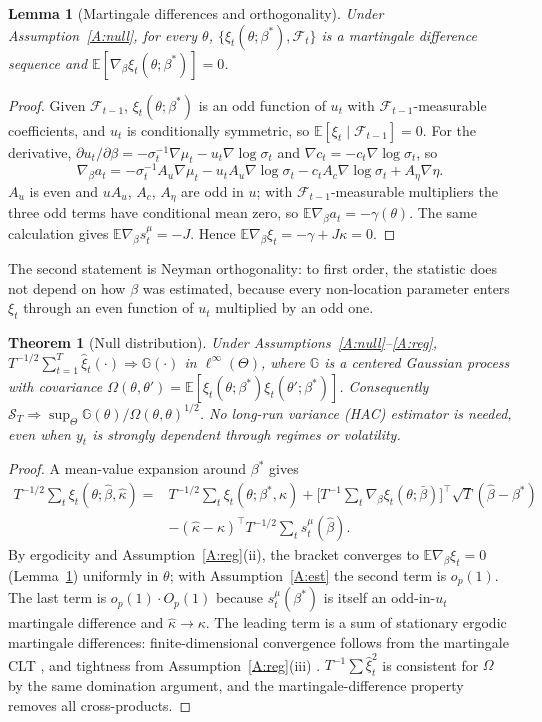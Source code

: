 \documentclass[11pt,a4paper]{article}
\newtheorem{theorem}{Theorem}
\newtheorem{lemma}{Lemma}
\theoremstyle{definition}
\theoremstyle{remark}
\newcommand{\E}{\mathbb{E}}
\newcommand{\F}{\mathcal{F}}
\newcommand{\tr}{^{\top}}
\begin{document}
\begin{lemma}[Martingale differences and orthogonality]\label{lem:mds}
Under Assumption~\ref{A:null}, for every $\theta$, $\{\xi_t(\theta;\beta^*),\F_t\}$ is a martingale difference sequence and $\E[\nabla_\beta\xi_t(\theta;\beta^*)]=0$.
\end{lemma}
\begin{proof}
Given $\F_{t-1}$, $\xi_t(\theta;\beta^*)$ is an odd function of $u_t$ with $\F_{t-1}$-measurable coefficients, and $u_t$ is conditionally symmetric, so $\E[\xi_t\mid\F_{t-1}]=0$. For the derivative, $\partial u_t/\partial\beta=-\sigma_t^{-1}\nabla\mu_t-u_t\nabla\log\sigma_t$ and $\nabla c_t=-c_t\nabla\log\sigma_t$, so
\[
\nabla_\beta a_t=-\sigma_t^{-1}A_u\nabla\mu_t-u_tA_u\nabla\log\sigma_t-c_tA_c\nabla\log\sigma_t+A_\eta\nabla\eta .
\]
$A_u$ is even and $uA_u$, $A_c$, $A_\eta$ are odd in $u$; with $\F_{t-1}$-measurable multipliers the three odd terms have conditional mean zero, so $\E\nabla_\beta a_t=-\gamma(\theta)$. The same calculation gives $\E\nabla_\beta s^\mu_t=-J$. Hence $\E\nabla_\beta\xi_t=-\gamma+J\kappa=0$.
\end{proof}
\noindent The second statement is Neyman orthogonality: to first order, the statistic does not depend on how $\beta$ was estimated, because every non-location parameter enters $\xi_t$ through an even function of $u_t$ multiplied by an odd one.

\begin{theorem}[Null distribution]\label{thm:null}
Under Assumptions~\ref{A:null}--\ref{A:reg}, $T^{-1/2}\sum_{t=1}^T\hat\xi_t(\cdot)\Rightarrow\mathbb G(\cdot)$ in $\ell^\infty(\Theta)$, where $\mathbb G$ is a centered Gaussian process with covariance $\Omega(\theta,\theta')=\E[\xi_t(\theta;\beta^*)\xi_t(\theta';\beta^*)]$. Consequently $\mathcal S_T\Rightarrow\sup_\Theta\mathbb G(\theta)/\Omega(\theta,\theta)^{1/2}$. No long-run variance (HAC) estimator is needed, even when $y_t$ is strongly dependent through regimes or volatility.
\end{theorem}
\begin{proof}
A mean-value expansion around $\beta^*$ gives
\[
\begin{aligned}
T^{-1/2}\sum_t\xi_t(\theta;\hat\beta,\hat\kappa)={}&T^{-1/2}\sum_t\xi_t(\theta;\beta^*,\kappa)+\Big[T^{-1}\sum_t\nabla_\beta\xi_t(\theta;\bar\beta)\Big]\tr\sqrt T(\hat\beta-\beta^*)\\
&-(\hat\kappa-\kappa)\tr T^{-1/2}\sum_t s^\mu_t(\hat\beta).
\end{aligned}
\]
By ergodicity and Assumption~\ref{A:reg}(ii), the bracket converges to $\E\nabla_\beta\xi_t=0$ (Lemma~\ref{lem:mds}) uniformly in $\theta$; with Assumption~\ref{A:est} the second term is $o_p(1)$. The last term is $o_p(1)\cdot O_p(1)$ because $s^\mu_t(\beta^*)$ is itself an odd-in-$u_t$ martingale difference and $\hat\kappa\to\kappa$. The leading term is a sum of stationary ergodic martingale differences: finite-dimensional convergence follows from the martingale CLT \citep{hall1980}, and tightness from Assumption~\ref{A:reg}(iii) \citep{andrews1994,hansen1996}. $T^{-1}\sum\hat\xi_t^2$ is consistent for $\Omega$ by the same domination argument, and the martingale-difference property removes all cross-products.
\end{proof}
\end{document}
